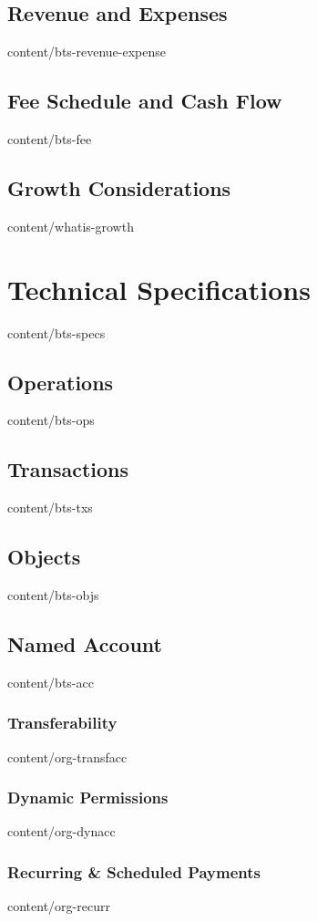 \documentclass{btswhitepaper}
\begin{document}
\subsection    { Revenue and Expenses              }  { content/bts-revenue-expense }
\subsection    { Fee Schedule and Cash Flow        }  { content/bts-fee             }
\subsection    { Growth Considerations             }  { content/whatis-growth       } 

\section       { Technical Specifications          }  { content/bts-specs           }
\subsection    { Operations                        }  { content/bts-ops             } 
\subsection    { Transactions                      }  { content/bts-txs             } 
\subsection    { Objects                           }  { content/bts-objs            } 
\subsection    { Named Account                     }  { content/bts-acc             } 
\subsubsection { Transferability                   }  { content/org-transfacc       } 
\subsubsection { Dynamic Permissions               }  { content/org-dynacc          } 
\subsubsection { Recurring \& Scheduled Payments   }  { content/org-recurr          } 
\end{document}
